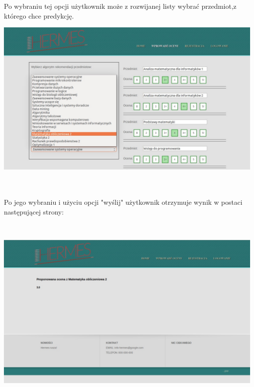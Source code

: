 \documentclass[licencjacka]{pracamgr}
\begin{document}
\newpage
Po wybraniu tej opcji użytkownik może z rozwijanej listy wybrać przedmiot,z którego chce predykcję. ~\\ \par
\begin{minipage}{\linewidth}
          \centering
           \includegraphics[scale=0.5]{predykcjaPrzedm.jpg}
\end{minipage} \\ \\


Po jego wybraniu i użyciu opcji "wyślij"  użytkownik otrzymuje wynik w postaci następującej strony: \\ \par 
 ~\\
\begin{minipage}{\linewidth}
	\centering
           \includegraphics[scale=0.5]{predykcjaPrzedmResult.jpg}
\end{minipage} \\ 
\end{document}
